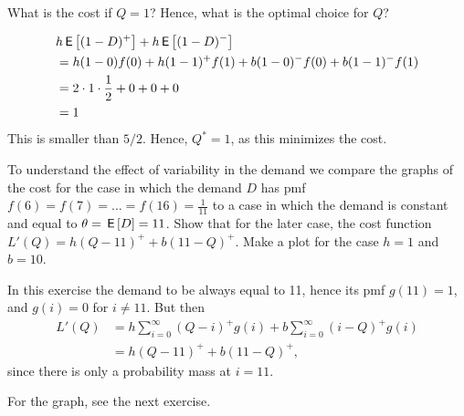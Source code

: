 \begin{exercise}[Continuation]  What is the cost if $Q=1$?  Hence, what is the optimal choice for $Q$?
\begin{solution}
\begin{align*}
&h\,\mathsf{E}\left[(1-D)^+\right] + h\,\mathsf{E}\left[(1-D)^-\right] \\
&= h (1-0)f(0) + h(1-1)^+f(1) + b (1-0)^-f(0) + b(1-1)^-f(1) \\
&= 2\cdot1\cdot\frac 1 2 + 0 + 0 + 0 \\
&=1
\end{align*}
This is smaller than $5/2$. Hence, $Q^*=1$, as this minimizes the cost.
\end{solution}
\end{exercise}

\begin{exercise}\label{ex:10}
To understand the effect of variability in the demand we compare the graphs of the cost for the case in which the  demand  $D$ has pmf $f(6)=f(7)=\ldots=f(16)=\frac{1}{11}$ to a case in which  the demand is constant and equal to $\theta = \,\mathsf{E}\left[D\right] = 11$. Show that for the later case, the cost function $L'(Q) = h(Q-11)^+ + b(11-Q)^+$. Make a plot for the case $h=1$ and $b=10$. 
  \begin{solution}
In this exercise  the demand to be always equal to 11, hence its pmf $g(11) = 1$, and $g(i)=0$ for $i\neq 11$. But then
\begin{align*}
  L'(Q) 
&=h\sum_{i=0}^\infty(Q-i)^+ g(i) + b\sum_{i=0}^{\infty}(i-Q)^+ g(i) \\
&=h(Q-11)^+  + b(11- Q)^+,
\end{align*}
since there is only a probability mass at $i=11$.

For the graph, see the next exercise.
  \end{solution}
\end{exercise}

